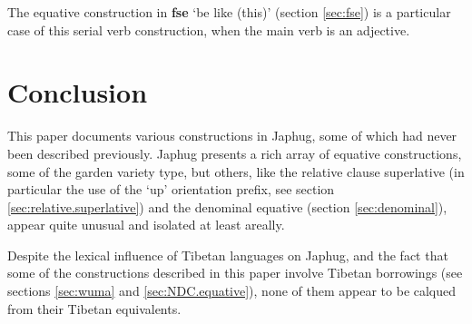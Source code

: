 \documentclass[oneside,a4paper,11pt]{article}
\newcommand{\ipa}[1]{{\phon\textbf{#1}}} %
\begin{document}
The equative construction in \ipa{fse} `be like (this)' (section \ref{sec:fse}) is a particular case of this serial verb construction, when the main verb is an adjective.

\section*{Conclusion}
This paper documents various constructions in Japhug, some of which had never been described previously. Japhug presents a rich array of equative constructions, some of the garden variety type, but others, like the relative clause superlative (in particular the use of the `up' orientation prefix, see section \ref{sec:relative.superlative}) and the denominal equative (section \ref{sec:denominal}), appear quite unusual and isolated at least areally.

Despite the lexical influence of Tibetan languages on Japhug, and the fact that some of the constructions described in this paper involve Tibetan borrowings (see sections \ref{sec:wuma} and \ref{sec:NDC.equative}), none of them appear to be calqued from their Tibetan equivalents.



\end{document}
